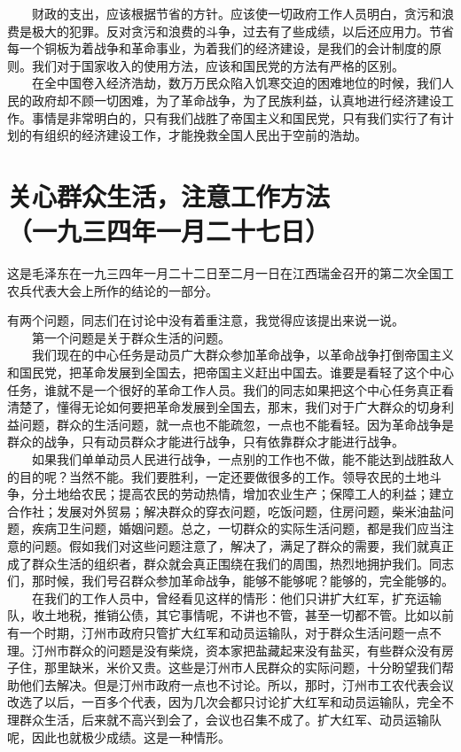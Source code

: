 \documentclass[cn,11pt,chinese]{elegantbook}
\def\myformat#1{\hfil\hfil #1}
\begin{document}
　　财政的支出，应该根据节省的方针。应该使一切政府工作人员明白，贪污和浪费是极大的犯罪。反对贪污和浪费的斗争，过去有了些成绩，以后还应用力。节省每一个铜板为着战争和革命事业，为着我们的经济建设，是我们的会计制度的原则。我们对于国家收入的使用方法，应该和国民党的方法有严格的区别。\\
　　在全中国卷入经济浩劫，数万万民众陷入饥寒交迫的困难地位的时候，我们人民的政府却不顾一切困难，为了革命战争，为了民族利益，认真地进行经济建设工作。事情是非常明白的，只有我们战胜了帝国主义和国民党，只有我们实行了有计划的有组织的经济建设工作，才能挽救全国人民出于空前的浩劫。\\
\newpage\section*{\myformat{关心群众生活，注意工作方法}\\\myformat{（一九三四年一月二十七日）}}
\begin{introduction}\item  这是毛泽东在一九三四年一月二十二日至二月一日在江西瑞金召开的第二次全国工农兵代表大会上所作的结论的一部分。\end{introduction}
有两个问题，同志们在讨论中没有着重注意，我觉得应该提出来说一说。\\
　　第一个问题是关于群众生活的问题。\\
　　我们现在的中心任务是动员广大群众参加革命战争，以革命战争打倒帝国主义和国民党，把革命发展到全国去，把帝国主义赶出中国去。谁要是看轻了这个中心任务，谁就不是一个很好的革命工作人员。我们的同志如果把这个中心任务真正看清楚了，懂得无论如何要把革命发展到全国去，那末，我们对于广大群众的切身利益问题，群众的生活问题，就一点也不能疏忽，一点也不能看轻。因为革命战争是群众的战争，只有动员群众才能进行战争，只有依靠群众才能进行战争。\\
　　如果我们单单动员人民进行战争，一点别的工作也不做，能不能达到战胜敌人的目的呢？当然不能。我们要胜利，一定还要做很多的工作。领导农民的土地斗争，分土地给农民；提高农民的劳动热情，增加农业生产；保障工人的利益；建立合作社；发展对外贸易；解决群众的穿衣问题，吃饭问题，住房问题，柴米油盐问题，疾病卫生问题，婚姻问题。总之，一切群众的实际生活问题，都是我们应当注意的问题。假如我们对这些问题注意了，解决了，满足了群众的需要，我们就真正成了群众生活的组织者，群众就会真正围绕在我们的周围，热烈地拥护我们。同志们，那时候，我们号召群众参加革命战争，能够不能够呢？能够的，完全能够的。\\
　　在我们的工作人员中，曾经看见这样的情形：他们只讲扩大红军，扩充运输队，收土地税，推销公债，其它事情呢，不讲也不管，甚至一切都不管。比如以前有一个时期，汀州市政府只管扩大红军和动员运输队，对于群众生活问题一点不理。汀州市群众的问题是没有柴烧，资本家把盐藏起来没有盐买，有些群众没有房子住，那里缺米，米价又贵。这些是汀州市人民群众的实际问题，十分盼望我们帮助他们去解决。但是汀州市政府一点也不讨论。所以，那时，汀州市工农代表会议改选了以后，一百多个代表，因为几次会都只讨论扩大红军和动员运输队，完全不理群众生活，后来就不高兴到会了，会议也召集不成了。扩大红军、动员运输队呢，因此也就极少成绩。这是一种情形。\\
\end{document}
